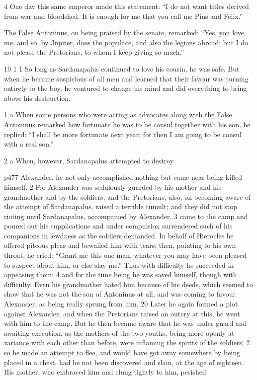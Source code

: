 4
One day this same emperor made this statement: ``I do not want titles derived from war and bloodshed. It is enough for me that you call me Pius and Felix.''

The False Antoninus, on being praised by the senate, remarked: ``Yes, you love me, and so, by Jupiter, does the populace, and also the legions abroad; but I do not please the Pretorians, to whom I keep giving so much.''

19
1 1 So long as Sardanapalus continued to love his cousin, he was safe. But when he became suspicious of all men and learned that their favour was turning entirely to the boy, he ventured to change his mind and did everything to bring above his destruction.

1 a When some persons who were acting as advocates along with the False Antoninus remarked how fortunate he was to be consul together with his son, he replied: ``I shall be more fortunate next year; for then I am going to be consul with a real son.''

2 a
When, however, Sardanapalus attempted to destroy

p477 Alexander, he not only accomplished nothing but came near being killed himself. 2 For Alexander was sedulously guarded by his mother and his grandmother and by the soldiers, and the Pretorians, also, on becoming aware of the attempt of Sardanapalus, raised a terrible tumult; and they did not stop rioting until Sardanapalus, accompanied by Alexander, 3 came to the camp and poured out his supplications and under compulsion surrendered such of his companions in lewdness as the soldiers demanded. In behalf of Hierocles he offered piteous pleas and bewailed him with tears; then, pointing to his own throat, he cried: ``Grant me this one man, whatever you may have been pleased to suspect about him, or else slay me.'' Thus with difficulty he succeeded in appeasing them; 4 and for the time being he was saved himself, though with difficulty. Even his grandmother hated him because of his deeds, which seemed to show that he was not the son of Antoninus at all, and was coming to favour Alexander, as being really sprung from him. 20 Later he again formed a plot against Alexander, and when the Pretorians raised an outcry at this, he went with him to the camp. But he then became aware that he was under guard and awaiting execution, as the mothers of the two youths, being more openly at variance with each other than before, were inflaming the spirits of the soldiers; 2 so he made an attempt to flee, and would have got away somewhere by being placed in a chest, had he not been discovered and slain, at the age of eighteen. His mother, who embraced him and clung tightly to him, perished

